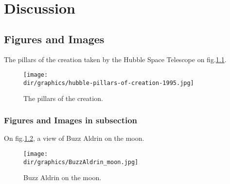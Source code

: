 \chapter{Discussion}
\label{chap: discussion}

\section{Figures and Images}
\label{sec: Figures and Images}

The pillars of the creation taken by the Hubble Space Telescope on fig.\ref{fig: pillars of the creation}.


\begin{figure}[h]
	\centering
	\texttt{[image: \\dir/graphics/hubble-pillars-of-creation-1995.jpg]}
	\caption{The pillars of the creation.}
	\label{fig: pillars of the creation}
\end{figure}


\subsection{Figures and Images in subsection}
\label{sec: Figures and Images in subsection}

On fig.\ref{fig: Buzz Aldrin on the moon}, a view of Buzz Aldrin on the moon.

\begin{figure}[h]
	\centering
	\texttt{[image: \\dir/graphics/BuzzAldrin\_moon.jpg]}
	\caption{Buzz Aldrin on the moon.}
	\label{fig: Buzz Aldrin on the moon}
\end{figure}